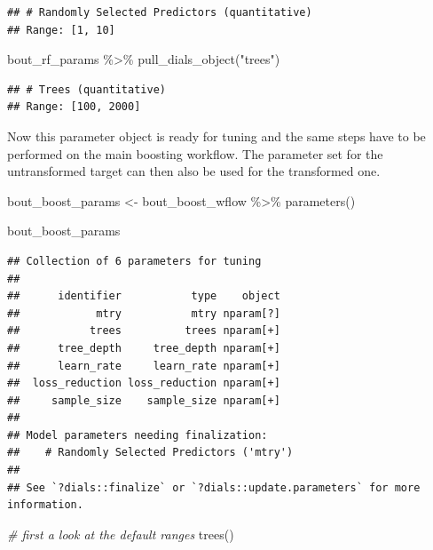 \documentclass[
]{book}
\newenvironment{Shaded}{\begin{snugshade}}{\end{snugshade}}
\newcommand{\CommentTok}[1]{\textcolor[rgb]{0.56,0.35,0.01}{\textit{#1}}}
\newcommand{\FunctionTok}[1]{\textcolor[rgb]{0.00,0.00,0.00}{#1}}
\newcommand{\NormalTok}[1]{#1}
\newcommand{\OtherTok}[1]{\textcolor[rgb]{0.56,0.35,0.01}{#1}}
\newcommand{\SpecialCharTok}[1]{\textcolor[rgb]{0.00,0.00,0.00}{#1}}
\newcommand{\StringTok}[1]{\textcolor[rgb]{0.31,0.60,0.02}{#1}}
\begin{document}
\begin{verbatim}
## # Randomly Selected Predictors (quantitative)
## Range: [1, 10]
\end{verbatim}

\begin{Shaded}
\begin{Highlighting}[]
\NormalTok{bout\_rf\_params }\SpecialCharTok{\%\textgreater{}\%} \FunctionTok{pull\_dials\_object}\NormalTok{(}\StringTok{"trees"}\NormalTok{)}
\end{Highlighting}
\end{Shaded}

\begin{verbatim}
## # Trees (quantitative)
## Range: [100, 2000]
\end{verbatim}

Now this parameter object is ready for tuning and the same steps have to be performed on the main boosting workflow. The parameter set for the untransformed target can then also be used for the transformed one.

\begin{Shaded}
\begin{Highlighting}[]
\NormalTok{bout\_boost\_params }\OtherTok{\textless{}{-}}\NormalTok{ bout\_boost\_wflow }\SpecialCharTok{\%\textgreater{}\%}
  \FunctionTok{parameters}\NormalTok{()}

\NormalTok{bout\_boost\_params }
\end{Highlighting}
\end{Shaded}

\begin{verbatim}
## Collection of 6 parameters for tuning
## 
##      identifier           type    object
##            mtry           mtry nparam[?]
##           trees          trees nparam[+]
##      tree_depth     tree_depth nparam[+]
##      learn_rate     learn_rate nparam[+]
##  loss_reduction loss_reduction nparam[+]
##     sample_size    sample_size nparam[+]
## 
## Model parameters needing finalization:
##    # Randomly Selected Predictors ('mtry')
## 
## See `?dials::finalize` or `?dials::update.parameters` for more information.
\end{verbatim}

\begin{Shaded}
\begin{Highlighting}[]
\CommentTok{\# first a look at the default ranges}
\FunctionTok{trees}\NormalTok{()}
\end{Highlighting}
\end{Shaded}
\end{document}
